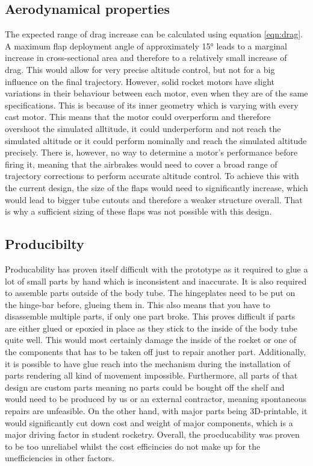 \documentclass[fontsize=11pt,%
twoside,%
BCOR          = 8mm, %
DIV           = 11,  %
titlepage     = off,%
index=totoc,%
xcolor        = pdftex,%
dvipsnames,%
bibliography  = totoc,%
bibliography = numbered, %
listof        = notnumbered]{scrreprt}
\begin{document}
\subsection{Aerodynamical properties}
The expected range of drag increase can be calculated using equation \ref{eqn:drag}. A maximum flap deployment angle of approximately 15° leads to a marginal increase in cross-sectional area and therefore to a relatively small increase of drag. This would allow for very precise altitude control, but not for a big influence on the final trajectory. However, solid rocket motors have slight variations in their behaviour between each motor, even when they are of the same specifications. This is because of its inner geometry which is varying with every cast motor. This means that the motor could overperform and therefore overshoot the simulated alltitude, it could underperform and not reach the simulated altitude or it could perform nominally and reach the simulated altitude precisely. There is, however, no way to determine a motor's performance before firing it, meaning that the airbrakes would need to cover a broad range of trajectory corrections to perform accurate altitude control. To achieve this with the current design, the size of the flaps would need to significantly increase, which would lead to bigger tube cutouts and therefore a weaker structure overall. That is why a sufficient sizing of these flaps was not possible with this design.

\subsection{Producibilty}
Producability has proven itself difficult with the prototype as it required to glue a lot of small parts by hand which is inconsistent and inaccurate. It is also required to assemble parts outside of the body tube. The hingeplates need to be put on the hinge-bar before, glueing them in. This also means that you have to disassemble multiple parts, if only one part broke. This proves difficult if parts are either glued or epoxied in place as they stick to the inside of the body tube quite well. This would most certainly damage the inside of the rocket or one of the components that has to be taken off just to repair another part. Additionally, it is possible to have glue reach into the mechanism during the installation of parts rendering all kind of movement impossible. Furthermore, all parts of that design are custom parts meaning no parts could be bought off the shelf and would need to be produced by us or an external contractor, meaning spontaneous repairs are unfeasible. On the other hand, with major parts being 3D-printable, it would significantly cut down cost and weight of major components, which is a major driving factor in student rocketry. Overall, the procducability was proven to be too unreliabel whilst the cost efficincies do not make up for the unefficiencies in other factors.
\end{document}
